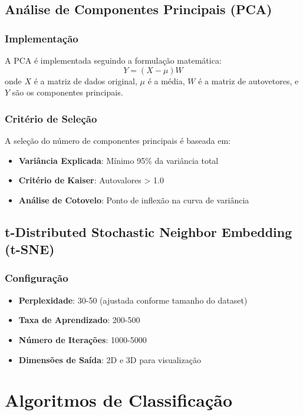 \subsection{Análise de Componentes Principais (PCA)}
\subsubsection{Implementação}
A PCA é implementada seguindo a formulação matemática:
\begin{equation}
Y = (X - \mu)W
\end{equation}
onde $X$ é a matriz de dados original, $\mu$ é a média, $W$ é a matriz de autovetores, e $Y$ são os componentes principais.

\subsubsection{Critério de Seleção}
A seleção do número de componentes principais é baseada em:
\begin{itemize}
    \item \textbf{Variância Explicada}: Mínimo 95\% da variância total
    \item \textbf{Critério de Kaiser}: Autovalores > 1.0
    \item \textbf{Análise de Cotovelo}: Ponto de inflexão na curva de variância
\end{itemize}

\subsection{t-Distributed Stochastic Neighbor Embedding (t-SNE)}
\subsubsection{Configuração}
\begin{itemize}
    \item \textbf{Perplexidade}: 30-50 (ajustada conforme tamanho do dataset)
    \item \textbf{Taxa de Aprendizado}: 200-500
    \item \textbf{Número de Iterações}: 1000-5000
    \item \textbf{Dimensões de Saída}: 2D e 3D para visualização
\end{itemize}

\section{Algoritmos de Classificação}\label{sec:classificacao}

